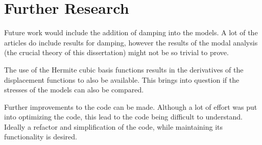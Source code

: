 \documentclass[../main.tex]{subfiles}
\begin{document}
\section{Further Research}
Future work would include the addition of damping into the models. A lot of the articles do include results for damping, however the results of the modal analysis (the crucial theory of this dissertation) might not be so trivial to prove.

The use of the Hermite cubic basis functions results in the derivatives of the displacement functions to also be available. This brings into question if the stresses of the models can also be compared.

Further improvements to the code can be made. Although a lot of effort was put into optimizing the code, this lead to the code being difficult to understand. Ideally a refactor and simplification of the code, while maintaining its functionality is desired.
\end{document}
